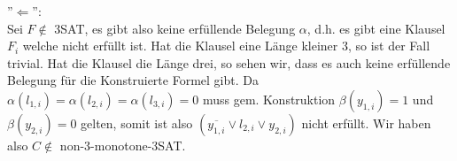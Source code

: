 \documentclass[a4paper,ngerman,12pt]{exam}
\newcommand\nmSAT{non-3-monotone-3SAT}
\begin{document}
\begin{questions}
\begin{parts}
{\begin{solution}
    ''$\Leftarrow$'': \\
        Sei $F \not\in$ 3SAT, es gibt also keine erfüllende Belegung $\alpha$, d.h.
        es gibt eine Klausel $F_i$ welche nicht erfüllt ist. Hat die Klausel eine Länge
        kleiner 3, so ist der Fall trivial. Hat die Klausel die Länge drei, so sehen wir,
        dass es auch keine erfüllende Belegung für die Konstruierte Formel gibt. Da
        $\alpha(l_{1,i}) = \alpha(l_{2,i}) = \alpha(l_{3,i}) = 0$ muss gem. Konstruktion
        $\beta(y_{1,i}) = 1$ und $\beta(y_{2,i}) = 0$ gelten, somit ist also
        $(\overline{y_{1,i}} \vee l_{2,i} \vee y_{2,i})$ nicht erfüllt. Wir haben
        also $C \not\in$ \nmSAT.

  \end{solution}}
\fi
  \end{parts}

\end{questions}
\end{document}
